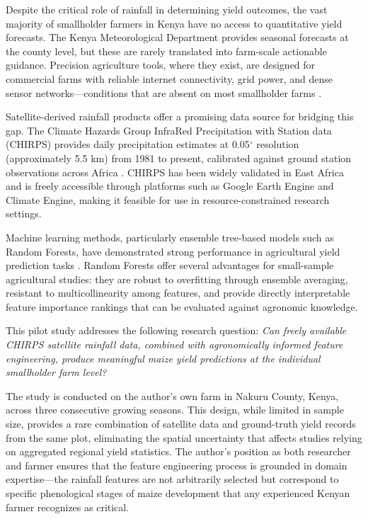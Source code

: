 \documentclass[11pt,a4paper]{article}
\begin{document}
Despite the critical role of rainfall in determining yield outcomes, the vast majority of smallholder farmers in Kenya have no access to quantitative yield forecasts. The Kenya Meteorological Department provides seasonal forecasts at the county level, but these are rarely translated into farm-scale actionable guidance. Precision agriculture tools, where they exist, are designed for commercial farms with reliable internet connectivity, grid power, and dense sensor networks---conditions that are absent on most smallholder farms \cite{kamilaris2018}.

Satellite-derived rainfall products offer a promising data source for bridging this gap. The Climate Hazards Group InfraRed Precipitation with Station data (CHIRPS) provides daily precipitation estimates at 0.05$^\circ$ resolution (approximately 5.5 km) from 1981 to present, calibrated against ground station observations across Africa \cite{funk2015}. CHIRPS has been widely validated in East Africa and is freely accessible through platforms such as Google Earth Engine and Climate Engine, making it feasible for use in resource-constrained research settings.

Machine learning methods, particularly ensemble tree-based models such as Random Forests, have demonstrated strong performance in agricultural yield prediction tasks \cite{jeong2016, schwalbert2020}. Random Forests offer several advantages for small-sample agricultural studies: they are robust to overfitting through ensemble averaging, resistant to multicollinearity among features, and provide directly interpretable feature importance rankings that can be evaluated against agronomic knowledge.

This pilot study addresses the following research question: \textit{Can freely available CHIRPS satellite rainfall data, combined with agronomically informed feature engineering, produce meaningful maize yield predictions at the individual smallholder farm level?}

The study is conducted on the author's own farm in Nakuru County, Kenya, across three consecutive growing seasons. This design, while limited in sample size, provides a rare combination of satellite data and ground-truth yield records from the same plot, eliminating the spatial uncertainty that affects studies relying on aggregated regional yield statistics. The author's position as both researcher and farmer ensures that the feature engineering process is grounded in domain expertise---the rainfall features are not arbitrarily selected but correspond to specific phenological stages of maize development that any experienced Kenyan farmer recognizes as critical.
\end{document}
